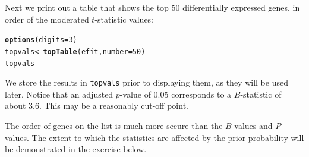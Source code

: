 \documentclass[a4paper,9pt]{article}\usepackage[]{graphicx}\usepackage[]{xcolor}
\makeatletter
\newcommand{\hlnum}[1]{\textcolor[rgb]{0.686,0.059,0.569}{#1}}%
\newcommand{\hlstd}[1]{\textcolor[rgb]{0.345,0.345,0.345}{#1}}%
\newcommand{\hlkwb}[1]{\textcolor[rgb]{0.69,0.353,0.396}{#1}}%
\newcommand{\hlkwc}[1]{\textcolor[rgb]{0.333,0.667,0.333}{#1}}%
\newcommand{\hlkwd}[1]{\textcolor[rgb]{0.737,0.353,0.396}{\textbf{#1}}}%
\newenvironment{kframe}{%
 \def\at@end@of@kframe{}%
 \ifinner\ifhmode%
  \def\at@end@of@kframe{\end{minipage}}%
  \begin{minipage}{\columnwidth}%
 \fi\fi%
 \def\FrameCommand##1{\hskip\@totalleftmargin \hskip-\fboxsep
 \colorbox{shadecolor}{##1}\hskip-\fboxsep
     \hskip-\linewidth \hskip-\@totalleftmargin \hskip\columnwidth}%
 \MakeFramed {\advance\hsize-\width
   \@totalleftmargin\z@ \linewidth\hsize
   \@setminipage}}%
 {\par\unskip\endMakeFramed%
 \at@end@of@kframe}
\newenvironment{knitrout}{}{} %
\makeatother
\begin{document}
Next we print out a table that shows the top 50 differentially
expressed genes, in order of the moderated $t$-statistic values:
\begin{knitrout}
\color{fgcolor}\begin{kframe}
\begin{alltt}
\hlkwd{options}\hlstd{(}\hlkwc{digits} \hlstd{=} \hlnum{3}\hlstd{)}
\hlstd{topvals} \hlkwb{<-} \hlkwd{topTable}\hlstd{(efit,} \hlkwc{number} \hlstd{=} \hlnum{50}\hlstd{)}
\hlstd{topvals}
\end{alltt}
\end{kframe}
\end{knitrout}
We store the results in \texttt{topvals} prior to displaying them,
as they will be used later.  Notice that an adjusted $p$-value of 0.05
corresponds to a $B$-statistic of about 3.6.  This may be a reasonably
cut-off point.

The order of genes on the list is much more secure than the $B$-values
and $P$-values.  The extent to which the statistics are affected by the
prior probability will be demonstrated in the exercise below.
\end{document}
